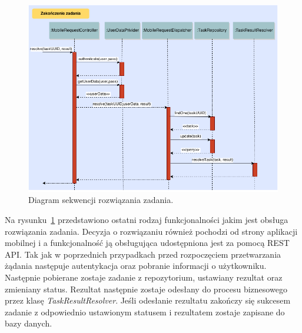 \begin{figure}[h]
\centerline{\includegraphics[scale=0.5]{resolveTaskFlow}}
\caption{Diagram sekwencji rozwiązania zadania.}
\label{fig:resolveTaskFlow}
\end{figure}

Na rysunku~\ref{fig:resolveTaskFlow} przedstawiono ostatni rodzaj funkcjonalności jakim jest obsługa rozwiązania zadania. Decyzja o rozwiązaniu również pochodzi od strony aplikacji mobilnej i a funkcjonalność ją obsługująca udostępniona jest za pomocą REST API. Tak jak w poprzednich przypadkach przed rozpoczęciem przetwarzania żądania następuje autentykacja oraz pobranie informacji o użytkowniku. Następnie pobierane zostaje zadanie z repozytorium, ustawiany rezultat oraz zmieniany status. Rezultat następnie zostaje odesłany do procesu biznesowego przez klasę \textit{TaskResultResolver}. Jeśli odesłanie rezultatu zakończy się sukcesem zadanie z odpowiednio ustawionym statusem i rezultatem zostaje zapisane do bazy danych.


